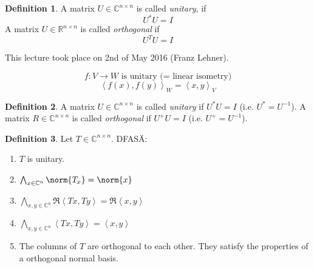 \documentclass[a4paper,landscape,twocolumn]{article}
\newcommand\meta[3]{This #1 took place on #2 (#3).\par}
\newcommand\functional[1]{\left\langle{#1}\right\rangle}
\theoremstyle{definition}
\newtheorem{defi}{Definition}
\DeclarePairedDelimiter\norm\lVert\rVert
\begin{document}
\begin{defi}
  \label{defi-8.69}
  A matrix $U \in \mathbb C^{n\times n}$ is called \emph{unitary},
  if \[ U^* U = I \]
  A matrix $U \in \mathbb R^{n\times n}$ is called \emph{orthogonal} if
  \[ U^T U = I \]
\end{defi}


\meta{lecture}{2nd of May 2016}{Franz Lehner}

\[ f: V \to W \text{ is unitary (= linear isometry)} \]
\[ \functional{f(x), f(y)}_W = \functional{x,y}_V \]

\begin{defi}
  A matrix $U \in \mathbb C^{n\times n}$ is called \emph{unitary}
  if $U^* U = I$ (i.e. $U^* = U^{-1}$).
  A matrix $R \in \mathbb C^{n\times n}$ is called \emph{orthogonal}
  if $U^+ U = I$ (i.e. $U^+ = U^{-1}$).
\end{defi}
\begin{defi}
  Let $T \in \mathbb C^{n\times n}$.
  DFAS\"A:
  \begin{enumerate}
    \item $T$ is unitary.
    \item $\bigwedge_{x \in \mathbb C^n} \norm{T_x} = \norm{x}$
    \item $\bigwedge_{x,y \in \mathbb C^n} \Re{\functional{Tx, Ty}} = \Re{\functional{x,y}}$
    \item $\bigwedge_{x,y \in \mathbb C^n} \functional{Tx, Ty} = \functional{x,y}$
    \item The columns of $T$ are orthogonal to each other. They satisfy the properties of a orthogonal normal basis.
  \end{enumerate}
\end{defi}
\end{document}
